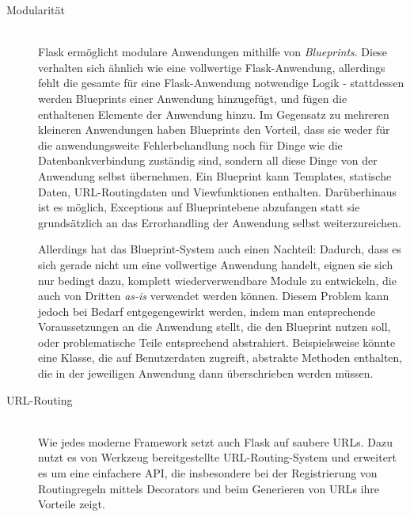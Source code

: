 \begin{description}
\item[Modularität] \hfill \\
Flask ermöglicht modulare Anwendungen mithilfe von \emph{Blueprints}. Diese verhalten sich ähnlich
wie eine vollwertige Flask-Anwendung, allerdings fehlt die gesamte für eine Flask-Anwendung
notwendige Logik - stattdessen werden Blueprints einer Anwendung hinzugefügt, und fügen die
enthaltenen Elemente der Anwendung hinzu. Im Gegensatz zu mehreren kleineren Anwendungen haben
Blueprints den Vorteil, dass sie weder für die anwendungsweite Fehlerbehandlung noch für Dinge wie
die Datenbankverbindung zuständig sind, sondern all diese Dinge von der Anwendung selbst übernehmen.
Ein Blueprint kann Templates, statische Daten, URL-Routingdaten und Viewfunktionen enthalten.
Darüberhinaus ist es möglich, Exceptions auf Blueprintebene abzufangen statt sie grundsätzlich an
das Errorhandling der Anwendung selbst weiterzureichen.

Allerdings hat das Blueprint-System auch einen Nachteil: Dadurch, dass es sich gerade nicht um eine
vollwertige Anwendung handelt, eignen sie sich nur bedingt dazu, komplett wiederverwendbare Module
zu entwickeln, die auch von Dritten \emph{as-is} verwendet werden können. Diesem Problem kann jedoch
bei Bedarf entgegengewirkt werden, indem man entsprechende Voraussetzungen an die Anwendung stellt,
die den Blueprint nutzen soll, oder problematische Teile entsprechend abstrahiert. Beispielsweise
könnte eine Klasse, die auf Benutzerdaten zugreift, abstrakte Methoden enthalten, die in der
jeweiligen Anwendung dann überschrieben werden müssen.


\item[URL-Routing] \hfill \\
Wie jedes moderne Framework setzt auch Flask auf saubere URLs. Dazu nutzt es von Werkzeug
bereitgestellte URL-Routing-System und erweitert es um eine einfachere API, die insbesondere bei der
Registrierung von Routingregeln mittels Decorators und beim Generieren von URLs ihre Vorteile zeigt.


\end{description}
